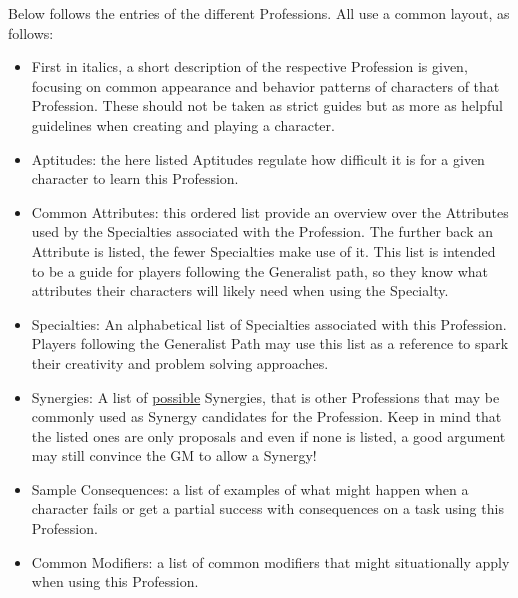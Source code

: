 Below follows the entries of the different Professions. 
All use a common layout, as follows:
\begin{itemize}
	\item First in italics, a short description of the respective Profession is given, focusing on common appearance and behavior patterns of characters of that Profession.
	These should not be taken as strict guides but as more as helpful guidelines when creating and playing a character.
	\item Aptitudes: the here listed Aptitudes regulate how difficult it is for a given character to learn this Profession.
	\item Common Attributes: this ordered list provide an overview over the Attributes used by the Specialties associated with the Profession. 
	The further back an Attribute is listed, the fewer Specialties make use of it.
	This list is intended to be a guide for players following the Generalist path, so they know what attributes their characters will likely need when using the Specialty.
	\item Specialties: An alphabetical list of Specialties associated with this Profession.
	Players following the Generalist Path may use this list as a reference to spark their creativity and problem solving approaches.
	\item Synergies: A list of \underline{possible} Synergies, that is other Professions that may be commonly used as Synergy candidates for the Profession. Keep in mind that the listed ones are only proposals and even if none is listed, a good argument may still convince the GM to allow a Synergy!
	\item Sample Consequences: a list of examples of what might happen when a character fails or get a partial success with consequences on a task using this Profession.
	\item Common Modifiers: a list of common modifiers that might situationally apply when using this Profession.
\end{itemize}


